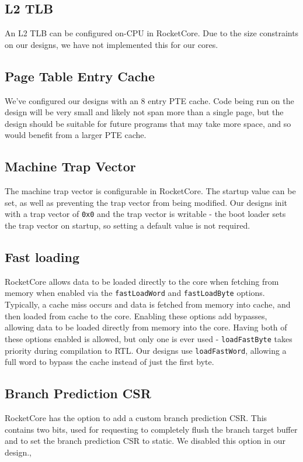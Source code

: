 \subsection{L2 TLB}
An L2 TLB can be configured on-CPU in RocketCore. Due to the size constraints on our designs, we have not implemented this for our cores.

\subsection{Page Table Entry Cache}
We've configured our designs with an 8 entry PTE cache. Code being run on the design will be very small and likely not span more than a single page, but the design should be suitable for future programs that may take more space, and so would benefit from a larger PTE cache.

\subsection{Machine Trap Vector}
The machine trap vector is configurable in RocketCore. The startup value can be set, as well as preventing the trap vector from being modified. Our designs init with a trap vector of \texttt{0x0} and the trap vector is writable - the boot loader sets the trap vector on startup, so setting a default value is not required.

\subsection{Fast loading}
RocketCore allows data to be loaded directly to the core when fetching from memory when enabled via the \texttt{fastLoadWord} and \texttt{fastLoadByte} options. Typically, a cache miss occurs and data is fetched from memory into cache, and then loaded from cache to the core. Enabling these options add bypasses, allowing data to be loaded directly from memory into the core. Having both of these options enabled is allowed, but only one is ever used - \texttt{loadFastByte} takes priority during compilation to RTL. Our designs use \texttt{loadFastWord}, allowing a full word to bypass the cache instead of just the first byte.

\subsection{Branch Prediction CSR}
RocketCore has the option to add a custom branch prediction CSR. This contains two bits, used for requesting to completely flush the branch target buffer and to set the branch prediction CSR to static. We disabled this option in our design.,

